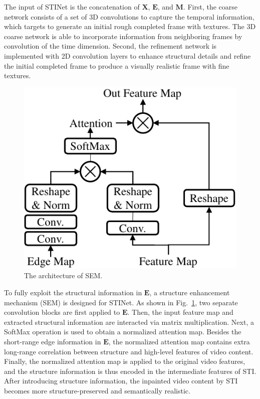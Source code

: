 %
The input of STINet is the concatenation of $\boldsymbol{X}$, $\boldsymbol{E}$, and $\boldsymbol{M}$.
First, the coarse network consists of a set of 3D convolutions to capture the temporal information, which targets to generate an initial rough completed frame with textures. 
The 3D coarse network is able to incorporate information from neighboring frames by convolution of the time dimension.
Second, the refinement network is implemented with 2D convolution layers to enhance structural details and refine the initial completed frame to produce a visually realistic frame with fine textures.

\begin{figure}[t]
	\centering
	\includegraphics[width=0.65\columnwidth]{SEM} %
	\caption{The architecture of SEM.}
	\label{SEM}
\end{figure}

To fully exploit the structural information in $\boldsymbol{E}$, a structure enhancement mechanism (SEM) is designed for STINet.
As shown in Fig.~\ref{SEM}, two separate convolution blocks are first applied to $\boldsymbol{E}$.
Then, the input feature map and extracted structural information are interacted via matrix multiplication. 
Next, a SoftMax operation is used to obtain a normalized attention map.
Besides the short-range edge information in $\boldsymbol{E}$, the normalized attention map contains extra long-range correlation between structure and high-level features of video content.
Finally, the normalized attention map is applied to the original video features, and the structure information is thus encoded in the intermediate features of STI.
After introducing structure information, the inpainted video content by STI becomes more structure-preserved and semantically realistic.

